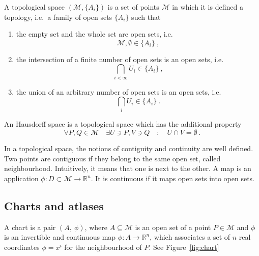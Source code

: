     \begin{definition}
        A topological space $(\mathcal M, \{A_i\})$ is a set of points $\mathcal M$ in which it is defined a topology, i.e.~a family of open sets $\{A_i\}$ such that 
    \begin{enumerate}
        \item the empty set and the whole set are open sets, i.e.
            \begin{equation*}
                \mathcal M, \emptyset \in \{A_i\} ~,
            \end{equation*}
        \item the intersection of a finite number of open sets is an open sets, i.e.
            \begin{equation*}
                \bigcap_{i<\infty} U_i \in \{A_i\} ~,
            \end{equation*}
        \item the union of an arbitrary number of open sets is an open sets, i.e.
            \begin{equation*}
                \bigcap_{i} U_i \in \{A_i\} ~.
            \end{equation*}
    \end{enumerate}
    \end{definition}
    \begin{definition}
    An Hausdorff space is a topological space which has the additional property  
    \begin{equation*}
        \forall P, Q \in \mathcal M \quad \exists U \ni P, V \ni Q \quad \colon \quad U \cap V = \emptyset ~.
    \end{equation*}
    \end{definition}
    \noindent In a topological space, the notions of contiguity and continuity are well defined. Two points are contiguous if they belong to the same open set, called neighbourhood. Intuitively, it means that one is next to the other. A map is an application $\phi \colon D \subset \mathcal M \rightarrow \mathbb R^n$. It is continuous if it maps open sets into open sets. 

\subsection{Charts and atlases}

    \begin{definition}[Chart]
        A chart is a pair $(A, ~\phi)$, where $A \subseteq \mathcal M$ is an open set of a point $P \in \mathcal M$ and $\phi$ is an invertible and continuous map $\phi \colon A \rightarrow \mathbb R^n$, which associates a set of $n$ real coordinates $\phi = x^i$ for the neighbourhood of $P$. See Figure~\ref{fig:chart}
    \end{definition}

